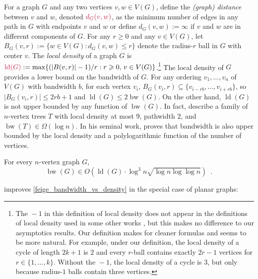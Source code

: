 \documentclass{patmorin}
\makeatletter
\renewcommand{\ge}{\geqslant}
\renewcommand{\le}{\leqslant}
\renewcommand{\leq}{\leqslant}
\newcommand{\defin}[1]{\emph{\textcolor{brightmaroon}{#1}}}
\def\mathcolor#1#{\@mathcolor{#1}}
\def\@mathcolor#1#2#3{%
  \protect\leavevmode
  \begingroup
    \color#1{#2}#3%
  \endgroup
}
\newcommand{\mathdefin}[1]{\mathcolor{brightmaroon}{#1}}
\DeclareMathOperator{\bw}{bw}
\DeclareMathOperator{\ld}{ld}
\makeatother
\begin{document}
For a graph $G$ and any two vertices $v,w\in V(G)$, define the \defin{(graph) distance} between $v$ and $w$, denoted $\mathdefin{d_G(v,w)}$, as the minimum number of edges in any path in $G$ with endpoints $v$ and $w$ or define $d_G(v,w):=\infty$ if $v$ and $w$ are in different components of $G$.  For any $r\ge 0$ and any $v\in V(G)$, let $B_G(v,r):=\{w\in V(G):d_G(v,w)\le r\}$ denote the radius-$r$ ball in $G$ with center $v$.
The \defin{local density} of a graph $G$ is $\mathdefin{\ld(G)}:=\max\{(|B(v,r)|-1)/r:r\ge 0,\, v\in V(G)\}$.\footnote{The ${}-1$ in this definition of local density does not appear in the definitions of local density used in some other works \cite{feige:approximating,rao:small}, but this makes no difference to our asymptotics results.  Our definition makes for cleaner formulas and seems to be more natural. For example, under our definition, the local density of a cycle of length $2k+1$ is $2$ and every $r$-ball contains exactly $2r-1$ vertices for $r\in\{1,\ldots,k\}$. Without the ${}-1$, the local density of a cycle is $3$, but only because radius-$1$ balls contain three vertices.} The local density of $G$ provides a lower bound on the bandwidth of $G$. For any ordering $v_1,\dots,v_n$ of $V(G)$ with bandwidth $b$, for each vertex $v_i$, $B_G(v_i,r) \subseteq \{v_{i-rb},\dots,v_{i+rb}\}$, so $|B_G(v_i,r)|\leq 2rb+1$ and $\ld(G)\leq 2\bw(G)$.
On the other hand, $\ld(G)$ is not upper bounded by any function of $\bw(G)$. In fact, \citet{CS89} describe a family of $n$-vertex trees $T$ with local density at most $9$, pathwidth $2$, and  $\bw(T)\in\Omega(\log n)$.
In his seminal work, \citet{feige:approximating} proves that bandwidth is also upper bounded by the local density and a polylogarithmic function of the number of vertices.

\begin{thm}\label{feige_bandwidth_vs_density}
  For every $n$-vertex graph $G$,
  \[
    \bw(G)\in O\left(\ld(G)\cdot \log^3 n\sqrt{\log n\log\log n}\right) \enspace .
  \]
\end{thm}

\citet{rao:small} improves \cref{feige_bandwidth_vs_density} in the special case of planar graphs:%
\end{document}

